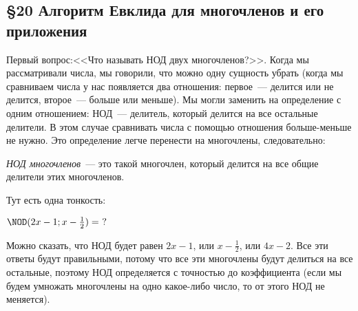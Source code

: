 \documentclass[russian]{lecture-notes}
\theoremstyle{definition}
\newcommand{\N}[2]{\NOD(#1;#2)}
\begin{document}
	\begin{center}
		\section*{\LARGE\S 20 Алгоритм Евклида для многочленов и его приложения}
		\label{par:evklid}
	\end{center}

	Первый вопрос:<<Что называть НОД двух многочленов?>>. Когда мы рассматривали числа, мы говорили, что можно одну сущность убрать (когда мы сравниваем числа у нас появляется два отношения: первое~--- делится или не делится, второе~--- больше или меньше). Мы могли заменить на определение с одним отношением: НОД~--- делитель, который делится на все остальные делители. В этом случае сравнивать числа с помощью отношения больше-меньше не нужно. Это определение легче перенести на многочлены, следовательно:
	
	\emph{НОД многочленов}~--- это такой многочлен, который делится на все общие делители этих многочленов.
	
	Тут есть одна тонкость:
	\begin{example}
		$\N{2x - 1}{x - \frac{1}{2}} = \ ?$
		
		Можно сказать, что НОД будет равен $2x - 1$, или $x - \frac{1}{2}$, или $4x - 2$. Все эти ответы будут правильными, потому что все эти многочлены будут делиться на все остальные, поэтому НОД определяется с точностью до коэффициента (если мы будем умножать многочлены на одно какое-либо число, то от этого НОД не меняется).
	\end{example}
\end{document}
